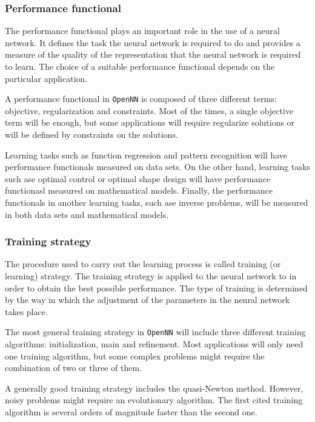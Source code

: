 \subsubsection*{Performance functional}

The performance functional plays an important role in the use of a neural
network. It defines the task the neural network is required to do
and provides a measure of the quality of the representation that the
neural network is required to learn. The choice of a suitable performance
functional depends on the particular application.

A performance functional in \texttt{OpenNN} is composed of three different terms: objective, regularization and constraints. 
Most of the times, a single objective term will be enough, but some applications will require regularize solutions 
or will be defined by constraints on the solutions. 

Learning tasks such as function regression and pattern recognition will have performance functionals measured on data sets. 
On the other hand, learning tasks such ase optimal control or optimal shape design will have performance functionasl measured on mathematical models.
Finally, the performance functionals in another learning tasks, such ase inverse problems, will be measured in both data sets and mathematical models.  

\subsubsection*{Training strategy}

The procedure
used to carry out the learning process is called training (or learning) strategy.
The training strategy is applied to the neural 
network to in order to obtain the best possible performance. The type of
training is determined by the way in which the adjustment of the
parameters in the neural network takes place.

The most general training strategy in \texttt{OpenNN} will include three different training algorithms: initialization, main and refinement. 
Most applications will only need one training algorithm, but some complex problems might require the combination of two or three of them. 

A generally good training strategy includes the quasi-Newton method. 
However, noisy problems might require an evolutionary algorithm. 
The first cited training algorithm is several orders of magnitude faster than the second one. 

